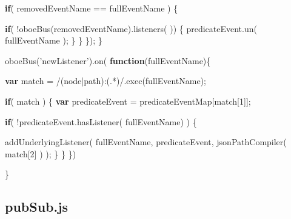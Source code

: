 \documentclass[12pt, ]{article}
\newenvironment{Shaded}{}{}
\newcommand{\KeywordTok}[1]{\textcolor[rgb]{0.00,0.44,0.13}{\textbf{{#1}}}}
\newcommand{\DecValTok}[1]{\textcolor[rgb]{0.25,0.63,0.44}{{#1}}}
\newcommand{\FloatTok}[1]{\textcolor[rgb]{0.25,0.63,0.44}{{#1}}}
\newcommand{\StringTok}[1]{\textcolor[rgb]{0.25,0.44,0.63}{{#1}}}
\newcommand{\OtherTok}[1]{\textcolor[rgb]{0.00,0.44,0.13}{{#1}}}
\newcommand{\FunctionTok}[1]{\textcolor[rgb]{0.02,0.16,0.49}{{#1}}}
\newcommand{\NormalTok}[1]{{#1}}
\begin{document}
\begin{Shaded}
\begin{Highlighting}[]
         \KeywordTok{if}\NormalTok{( removedEventName == fullEventName ) \{}
         
            \KeywordTok{if}\NormalTok{( !}\FunctionTok{oboeBus}\NormalTok{(removedEventName).}\FunctionTok{listeners}\NormalTok{(  )) \{}
               \OtherTok{predicateEvent}\NormalTok{.}\FunctionTok{un}\NormalTok{( fullEventName );}
            \NormalTok{\}}
         \NormalTok{\}}
      \NormalTok{\});   }
   \NormalTok{\}}

   \FunctionTok{oboeBus}\NormalTok{(}\StringTok{'newListener'}\NormalTok{).}\FunctionTok{on}\NormalTok{( }\KeywordTok{function}\NormalTok{(fullEventName)\{}

      \KeywordTok{var} \NormalTok{match = }\OtherTok{/}\FloatTok{(}\OtherTok{node}\FloatTok{|}\OtherTok{path}\FloatTok{)}\OtherTok{:}\FloatTok{(}\OtherTok{.}\FloatTok{*)}\OtherTok{/}\NormalTok{.}\FunctionTok{exec}\NormalTok{(fullEventName);}
      
      \KeywordTok{if}\NormalTok{( match ) \{}
         \KeywordTok{var} \NormalTok{predicateEvent = predicateEventMap[match[}\DecValTok{1}\NormalTok{]];}
                    
         \KeywordTok{if}\NormalTok{( !}\OtherTok{predicateEvent}\NormalTok{.}\FunctionTok{hasListener}\NormalTok{( fullEventName) ) \{  }
                  
            \FunctionTok{addUnderlyingListener}\NormalTok{(}
               \NormalTok{fullEventName,}
               \NormalTok{predicateEvent, }
               \FunctionTok{jsonPathCompiler}\NormalTok{( match[}\DecValTok{2}\NormalTok{] )}
            \NormalTok{);}
         \NormalTok{\}}
      \NormalTok{\}    }
   \NormalTok{\})}

\NormalTok{\}}
\end{Highlighting}
\end{Shaded}

\pagebreak

\subsection{pubSub.js}\label{headerux5fpubSub}

\label{src_pubSub}
\end{document}
